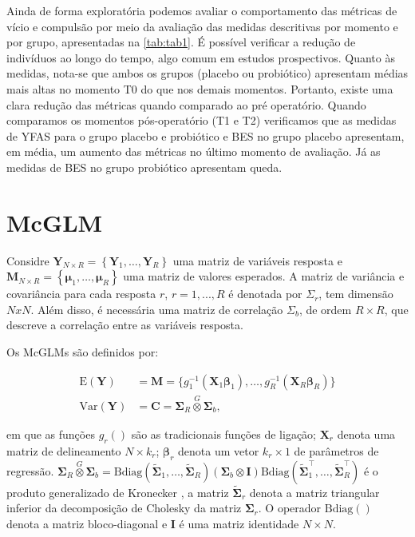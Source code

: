 \documentclass[AMA,STIX1COL]{WileyNJD-v2}
\begin{document}
Ainda de forma exploratória podemos avaliar o comportamento das métricas de vício e compulsão por meio da avaliação das medidas descritivas por momento e por grupo, apresentadas na \autoref{tab:tab1}. É possível verificar a redução de indivíduos ao longo do tempo, algo comum em estudos prospectivos. Quanto às medidas, nota-se que ambos os grupos (placebo ou probiótico) apresentam médias mais altas no momento T0 do que nos demais momentos. Portanto, existe uma clara redução das métricas quando comparado ao pré operatório. Quando comparamos os momentos pós-operatório (T1 e T2) verificamos que as medidas de YFAS para o grupo placebo e probiótico e BES no grupo placebo apresentam, em média, um aumento das métricas no último momento de avaliação. Já as medidas de BES no grupo probiótico apresentam queda.


\section{McGLM}\label{sec3}

Considre $\boldsymbol{Y}_{N \times R} = \left \{ \boldsymbol{Y}_1, \dots, \boldsymbol{Y}_R \right \}$ uma  matriz de variáveis resposta e $\boldsymbol{M}_{N \times R} = \left \{ \boldsymbol{\mu}_1, \dots, \boldsymbol{\mu}_R \right \}$ uma matriz de valores esperados. A matriz de variância e covariância para cada resposta $r$, $r = 1,..., R$ é denotada por $\Sigma_r$, tem dimensão $NxN$. Além disso, é necessária uma matriz de correlação $\Sigma_b$, de ordem $R \times R$, que descreve a correlação entre as variáveis resposta. 

Os McGLMs \citep{Bonat16}são definidos por:

$$
      \begin{aligned}
        \mathrm{E}(\boldsymbol{Y}) &=
          \boldsymbol{M} =
            \{g_1^{-1}(\boldsymbol{X}_1 \boldsymbol{\beta}_1),
            \ldots,
            g_R^{-1}(\boldsymbol{X}_R \boldsymbol{\beta}_R)\}
          \\
        \mathrm{Var}(\boldsymbol{Y}) &=
          \boldsymbol{C} =
            \boldsymbol{\Sigma}_R \overset{G} \otimes
            \boldsymbol{\Sigma}_b,
      \end{aligned}
$$

\noindent em que as funções $g_r()$ são as tradicionais funções de ligação; $\boldsymbol{X}_r$ denota uma matriz de delineamento $N \times k_r$; $\boldsymbol{\beta}_r$ denota um vetor $k_r \times 1$ de parâmetros de regressão. $\boldsymbol{\Sigma}_R \overset{G} \otimes \boldsymbol{\Sigma}_b = \mathrm{Bdiag}(\tilde{\boldsymbol{\Sigma}}_1, \ldots, \tilde{\boldsymbol{\Sigma}}_R) (\boldsymbol{\Sigma}_b \otimes \boldsymbol{I}) \mathrm{Bdiag}(\tilde{\boldsymbol{\Sigma}}_1^\top, \ldots, \tilde{\boldsymbol{\Sigma}}_R^\top)$ é o produto generalizado de Kronecker \cite{martinez13}, a matriz $\tilde{\boldsymbol{\Sigma}}_r$ denota a matriz triangular inferior da decomposição de Cholesky da matriz ${\boldsymbol{\Sigma}}_r$. O operador $\mathrm{Bdiag()}$ denota a matriz bloco-diagonal e $\boldsymbol{I}$ é uma matriz identidade $N \times N$. 
\end{document}
